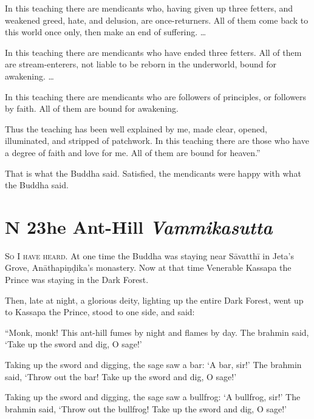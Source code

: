 \documentclass[12pt,openany]{book}%
\newcommand*{\suttatitleacronym}[1]{\smaller[2]{#1}\vspace*{.3em}}
\newcommand*{\suttatitletranslation}[1]{\linebreak{#1}}
\newcommand*{\suttatitleroot}[1]{\linebreak\smaller[2]\itshape{#1}}
\newcommand*{\tocacronym}[1]{\hspace*{-3.3em}{#1}\quad}
\newcommand*{\toctranslation}[1]{#1}
\newcommand*{\tocroot}[1]{(\textit{#1})}
\newcommand*{\scevam}[1]{\textsc{#1}}
\begin{document}
In this teaching there are mendicants who, having given up three fetters, and weakened greed, hate, and delusion, are once-returners. All of them come back to this world once only, then make an end of suffering. … 

In this teaching there are mendicants who have ended three fetters. All of them are stream-enterers, not liable to be reborn in the underworld, bound for awakening. … 

In this teaching there are mendicants who are followers of principles, or followers by faith. All of them are bound for awakening. 

Thus the teaching has been well explained by me, made clear, opened, illuminated, and stripped of patchwork. In this teaching there are those who have a degree of faith and love for me. All of them are bound for heaven.” 

That is what the Buddha said. Satisfied, the mendicants were happy with what the Buddha said. 

%
\section*{{\suttatitleacronym MN 23}{\suttatitletranslation The Ant-Hill }{\suttatitleroot Vammikasutta}}
\addcontentsline{toc}{section}{\tocacronym{MN 23} \toctranslation{The Ant-Hill } \tocroot{Vammikasutta}}

\scevam{So I have heard. }At one time the Buddha was staying near \textsanskrit{Sāvatthī} in Jeta’s Grove, \textsanskrit{Anāthapiṇḍika}’s monastery. Now at that time Venerable Kassapa the Prince was staying in the Dark Forest. 

Then, late at night, a glorious deity, lighting up the entire Dark Forest, went up to Kassapa the Prince, stood to one side, and said: 

“Monk, monk! This ant-hill fumes by night and flames by day. The brahmin said, ‘Take up the sword and dig, O sage!’ 

Taking up the sword and digging, the sage saw a bar: ‘A bar, sir!’ The brahmin said, ‘Throw out the bar! Take up the sword and dig, O sage!’ 

Taking up the sword and digging, the sage saw a bullfrog: ‘A bullfrog, sir!’ The brahmin said, ‘Throw out the bullfrog! Take up the sword and dig, O sage!’ 
\end{document}
